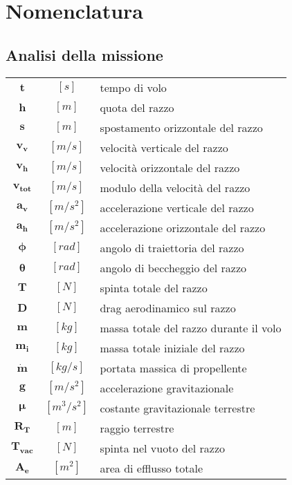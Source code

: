 \section{Nomenclatura}
\label{sec:nomenclatura}
\setcounter{subsection}{1}

\begin{multicols}{2}

	\subsection{Analisi della missione}
	\small
	\begin{tabularx}{\linewidth}{cc>{\raggedright\arraybackslash}X}
		$\bm{t}$ & $[s]$ & tempo di volo \\
		$\bm{h}$ & $[m]$ & quota del razzo \\
		$\bm{s}$ & $[m]$ & spostamento orizzontale del razzo \\
		$\bm{v_v}$ & $[m/s]$ & velocità verticale del razzo \\
		$\bm{v_h}$ & $[m/s]$ & velocità orizzontale del razzo \\
		$\bm{v_{tot}}$ & $[m/s]$ & modulo della velocità del razzo \\
		$\bm{a_v}$ & $[m/s^2]$ & accelerazione verticale del razzo \\
		$\bm{a_h}$ & $[m/s^2]$ & accelerazione orizzontale del razzo \\
		$\bm{\phi}$ & $[rad]$ & angolo di traiettoria del razzo \\
		$\bm{\theta}$ & $[rad]$ & angolo di beccheggio del razzo \\
		$\bm{T}$ & $[N]$ & spinta totale del razzo \\
		$\bm{D}$ & $[N]$ & drag aerodinamico sul razzo \\
		$\bm{m}$ & $[kg]$ & massa totale del razzo durante il volo \\
		$\bm{m_i}$ & $[kg]$ & massa totale iniziale del razzo \\
		$\bm{\dot{m}}$ & $[kg/s]$ & portata massica di propellente \\
		$\bm{g}$ & $[m/s^2]$ & accelerazione gravitazionale \\
		$\bm{\mu}$ & $[m^3/s^2]$ & costante gravitazionale terrestre \\
		$\bm{R_T}$ & $[m]$ & raggio terrestre \\
		$\bm{T_{vac}}$ & $[N]$ & spinta nel vuoto del razzo \\
		$\bm{A_e}$ & $[m^2]$ & area di efflusso totale \\

\end{tabularx}
\end{multicols}
